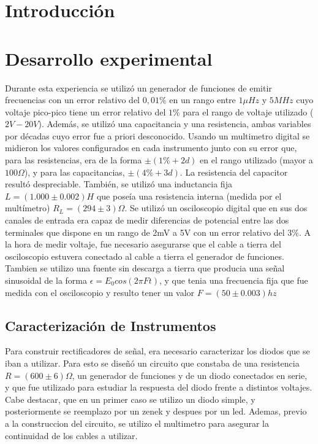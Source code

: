 \documentclass[11pt,a4paper]{article}
\begin{document}
\section{Introducción}\label{sec:intro}




\section{Desarrollo experimental}

Durante esta experiencia se utilizó un generador de funciones de emitir frecuencias con un error relativo del $0,01\%$ en un rango entre $1\mu Hz$ y $5MHz$ cuyo voltaje pico-pico tiene un error relativo del $1\%$ para el rango de voltaje utilizado ($2V-20V$). Además, se utilizó una capacitancia y una resistencia, ambas variables por décadas cuyo error fue a priori desconocido. Usando un multimetro digital se midieron los valores configurados en cada instrumento junto con su error que, para las resistencias, era de la forma $\pm(1\%+2d)$ en el rango utilizado (mayor a $100\Omega$), y para las  capacitancias, $\pm(4\%+3d)$. La resistencia del capacitor resultó despreciable. También, se utilizó una inductancia fija $L = (1.000 \pm 0.002) H$ que poseía una resistencia interna (medida por el multímetro) $R_L = (294 \pm 3) \Omega$.
Se utilizó un osciloscopio digital que en sus dos canales de entrada era capaz de medir diferencias de potencial entre las dos terminales que dispone en un rango de 2mV a 5V con un error relativo del $3\%$. A la hora de medir voltaje, fue necesario asegurarse que el cable a tierra del osciloscopio estuvera conectado al cable a tierra el generador de funciones. 
Tambien se utilizo una fuente sin descarga a tierra que producia una señal sinusoidal de la forma $\epsilon = E_{0}cos(2\pi Ft)$, y que tenia una frecuencia fija que fue medida con el osciloscopio y resulto tener un valor $F = (50 \pm 0.003)hz$


\subsection{Caracterización de Instrumentos}
Para construir rectificadores de señal, era necesario caracterizar los diodos que se iban a utilizar. Para esto se diseñó un circuito que constaba de una resistencia \textbf{$R = (600 \pm 6)\Omega$}, un generador de funciones y de un diodo conectados en serie, y que fue utilizado para estudiar la respuesta del diodo frente a distintos voltajes. Cabe destacar, que en un primer caso se utilizo un diodo simple, y posteriormente se reemplazo por un zenek y despues por un led. Ademas, previo a la construccion del circuito, se utilizo el multimetro para asegurar la continuidad de los cables a utilizar.
\end{document}
